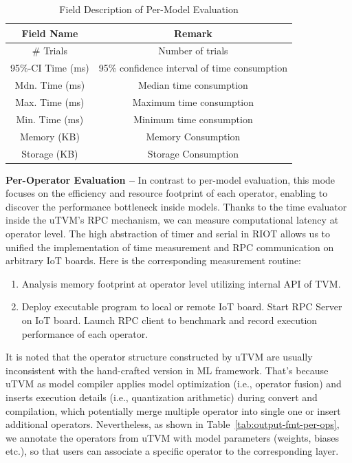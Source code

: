 \begin{table}[ht]
    \centering
    \caption{Field Description of Per-Model Evaluation}
    \begin{tabular}{cc}
    \hline
Field Name   & Remark                                \\\hline
\# Trials    & Number of trials \\
95\%-CI Time (ms)  & 95\% confidence interval of time consumption\\
Mdn. Time (ms)  & Median time consumption \\
Max. Time (ms)  & Maximum time consumption\\
Min. Time (ms)  & Minimum time consumption     \\
Memory (KB)  & Memory Consumption       \\
Storage (KB) & Storage Consumption      \\\hline
    \end{tabular}
    \label{tab:output-fmt-per-model}
\end{table}

{\bf Per-Operator Evaluation --}
In contrast to per-model evaluation, this mode focuses on the efficiency and resource footprint of each operator, enabling to discover the performance bottleneck inside models. Thanks to the time evaluator inside the uTVM's RPC mechanism, we can measure computational latency at operator level. The high abstraction of timer and serial in RIOT allows us to unified the implementation of time measurement and RPC communication on arbitrary IoT boards. Here is the corresponding measurement routine:

\begin{enumerate}
    \item Analysis memory footprint at operator level utilizing internal API of TVM.
    \item Deploy executable program to local or remote IoT board.
    \itembf Start RPC Server on IoT board.
    \itembf Launch RPC client to benchmark and record execution performance of each operator.
\end{enumerate}

It is noted that the operator structure constructed by uTVM are usually inconsistent with the hand-crafted version in ML framework. That's because uTVM as model compiler applies model optimization (i.e., operator fusion) and inserts execution details (i.e., quantization arithmetic) during convert and compilation, which potentially merge multiple operator into single one or insert additional operators. Nevertheless, as shown in Table~\ref{tab:output-fmt-per-ops}, we annotate the operators from uTVM with model parameters (weights, biases etc.), so that users can associate a specific operator to the corresponding layer.


